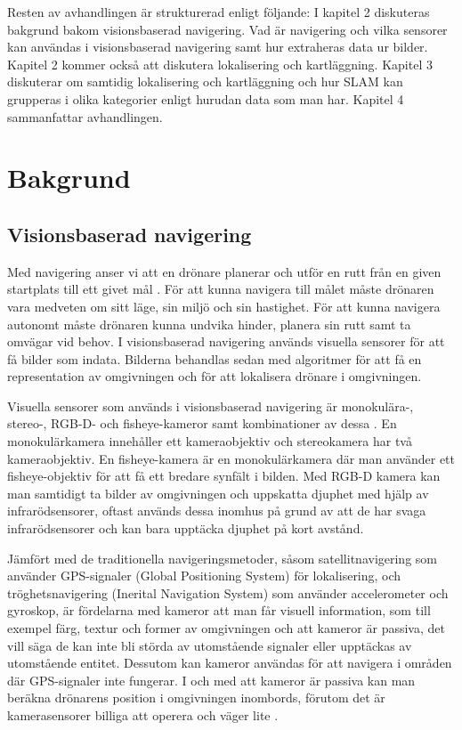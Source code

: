 Resten av avhandlingen är strukturerad enligt följande: I kapitel 2 diskuteras bakgrund bakom visionsbaserad navigering. Vad är navigering och vilka sensorer kan användas i visionsbaserad navigering samt hur extraheras data ur bilder. Kapitel 2 kommer också att diskutera lokalisering och kartläggning. Kapitel 3 diskuterar om samtidig lokalisering och kartläggning och hur SLAM kan grupperas i olika kategorier enligt hurudan data som man har. Kapitel 4 sammanfattar avhandlingen.

\chapter{Bakgrund}

\section{Visionsbaserad navigering}

Med navigering anser vi att en drönare planerar och utför en rutt från en given startplats till ett givet mål \citep{geospatial}. För att kunna navigera till målet måste drönaren vara medveten om sitt läge, sin miljö och sin hastighet. För att kunna navigera autonomt måste drönaren kunna undvika hinder, planera sin rutt samt ta omvägar vid behov. I visionsbaserad navigering används visuella sensorer för att få bilder som indata. Bilderna behandlas sedan med algoritmer för att få en representation av omgivningen och för att lokalisera drönare i omgivningen. 

Visuella sensorer som används i visionsbaserad navigering är monokulära-, stereo-, RGB-D- och fisheye-kameror samt kombinationer av dessa \citep{geospatial}. En monokulärkamera innehåller ett kameraobjektiv och stereokamera har två kameraobjektiv. En fisheye-kamera är en monokulärkamera där man använder ett fisheye-objektiv för att få ett bredare synfält i bilden. Med RGB-D kamera kan man samtidigt ta bilder av omgivningen och uppskatta djuphet med hjälp av infrarödsensorer, oftast används dessa inomhus på grund av att de har svaga infrarödsensorer och kan bara upptäcka djuphet på kort avstånd. 

Jämfört med de traditionella navigeringsmetoder, såsom satellitnavigering som använder GPS-signaler (Global Positioning System) för lokalisering, och tröghetsnavigering (Inerital Navigation System) som använder accelerometer och gyroskop, är fördelarna med kameror att man får visuell information, som till exempel färg, textur och former av omgivningen och att kameror är passiva, det vill säga de kan inte bli störda av utomstående signaler eller upptäckas av utomstående entitet. Dessutom kan kameror användas för att navigera i områden där GPS-signaler inte fungerar. I och med att kameror är passiva kan man beräkna drönarens position i omgivningen inombords, förutom det är kamerasensorer billiga att operera och väger lite \citep{opticalflowuav,geospatial}.

